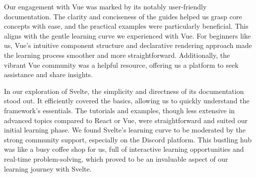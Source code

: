 Our engagement with Vue was marked by its notably user-friendly documentation. The clarity and conciseness of the guides helped us grasp core concepts with ease, and the practical examples were particularly beneficial. This aligns with the gentle learning curve we experienced with Vue. For beginners like us, Vue's intuitive component structure and declarative rendering approach made the learning process smoother and more straightforward. Additionally, the vibrant Vue community was a helpful resource, offering us a platform to seek assistance and share insights.

In our exploration of Svelte, the simplicity and directness of its documentation stood out. It efficiently covered the basics, allowing us to quickly understand the framework's essentials. The tutorials and examples, though less extensive in advanced topics compared to React or Vue, were straightforward and suited our initial learning phase. We found Svelte's learning curve to be moderated by the strong community support, especially on the Discord platform. This bustling hub was like a busy coffee shop for us, full of interactive learning opportunities and real-time problem-solving, which proved to be an invaluable aspect of our learning journey with Svelte.
